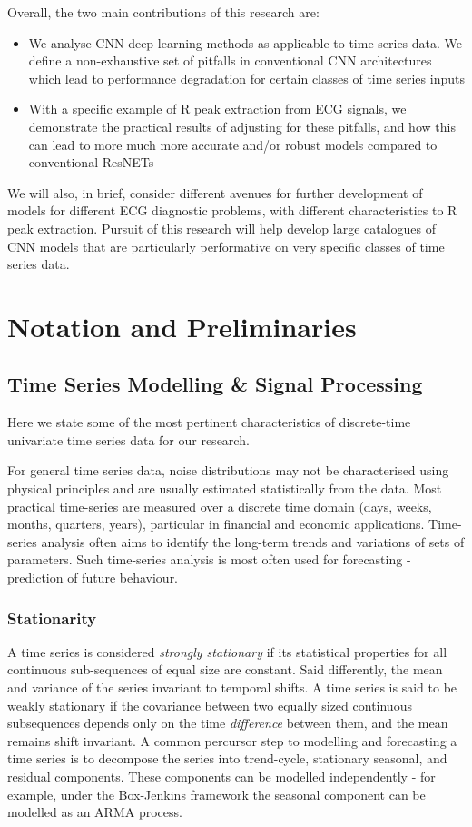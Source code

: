 \documentclass[9pt,conference]{IEEEtran}
\begin{document}
Overall, the two main contributions of this research are:
\begin{itemize}
    \item We analyse CNN deep learning methods as applicable to time series data. We define a non-exhaustive set of pitfalls in conventional CNN architectures which lead to performance degradation for certain classes of time series inputs
    \item With a specific example of R peak extraction from ECG signals, we demonstrate the practical results of adjusting for these pitfalls, and how this can lead to more much more accurate and/or robust models compared to conventional ResNETs
\end{itemize}

We will also, in brief, consider different avenues for further development of models for different ECG diagnostic problems, with different characteristics to R peak extraction. Pursuit of this research will help develop large catalogues of CNN models that are particularly performative on very specific classes of time series data.

\section{Notation and Preliminaries}


\subsection{Time Series Modelling \& Signal Processing}
Here we state some of the most pertinent characteristics of discrete-time univariate time series data for our research. 

For general time series data, noise distributions may not be characterised using physical principles and are usually estimated statistically from the data. Most practical time-series are measured over a discrete time domain (days, weeks, months, quarters, years), particular in financial and economic applications. Time-series analysis often aims to identify the long-term trends and variations of sets of parameters. Such time-series analysis is most often used for forecasting - prediction of future behaviour. 

\subsubsection{Stationarity}
A time series is considered  \textit{strongly stationary} if its statistical properties for all continuous sub-sequences of equal size are constant. Said differently, the mean and variance of the series invariant to temporal shifts. A time series is said to be weakly stationary if the covariance between two equally sized continuous subsequences depends only on the time \textit{difference} between them, and the mean remains shift invariant. A common percursor step to modelling and forecasting a time series is to decompose the series into trend-cycle, stationary seasonal, and residual components. \cite{brockwell2002introduction} These components can be modelled independently - for example, under the Box-Jenkins framework the seasonal component can be modelled as an ARMA process.
\end{document}
